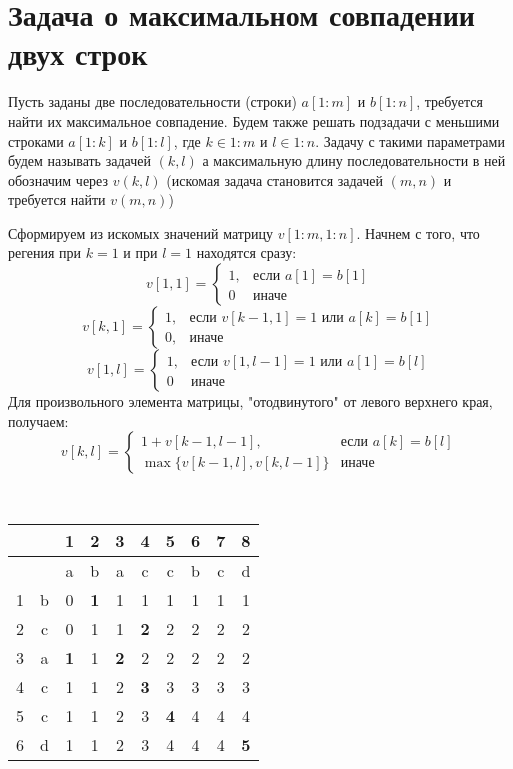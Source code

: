 \documentclass[discrete.tex]{subfiles}
\begin{document}
  \section{Задача о максимальном совпадении двух строк}

  \begin{Task}
    Пусть заданы две последовательности (строки) $a[1:m]$ и $b[1:n]$, требуется найти их максимальное совпадение. Будем также решать подзадачи с меньшими строками $a[1:k]$ и $b[1:l]$, где $k \in 1:m$ и $l \in 1:n$. Задачу с такими параметрами будем называть задачей $(k,l)$ а максимальную длину последовательности в ней обозначим через $v(k,l)$ (искомая задача становится задачей $(m,n)$ и требуется найти $v(m,n)$)

    Сформируем из искомых значений матрицу $v[1:m,1:n]$. Начнем с того, что регения при $k=1$ и при $l=1$ находятся сразу:
    \[v[1,1] = \begin{cases}
      1, & \text{если }a[1]=b[1]\\
      0 & \text{иначе}
    \end{cases}\]
    \[v[k,1] = \begin{cases}
      1, & \text{если }v[k-1,1]=1 \text{ или } a[k]=b[1]\\
      0, & \text{иначе}
    \end{cases}\]
    \[v[1,l] = \begin{cases}
      1, & \text{если }v[1,l-1]=1 \text{ или } a[1]=b[l]\\
      0 & \text{иначе}
    \end{cases}\]
    Для произвольного элемента матрицы, "отодвинутого"{} от левого верхнего края, получаем:
    \[v[k,l] = \begin{cases}
      1 + v[k-1,l-1], & \text{если }a[k]=b[l]\\
      \max\{v[k-1,l],v[k,l-1]\} & \text{иначе}
    \end{cases}\]
  \end{Task}

  \begin{example} \ \\
    \begin{tabular}{c|c|cccccccc}
        &   & 1 & 2 & 3 & 4 & 5 & 6 & 7 & 8\\
        \hline
        &   & a & b & a & c & c & b & c & d\\
      \hline
      1 & b & 0 & \bfseries 1 & 1 & 1 & 1 & 1 & 1 & 1\\
      2 & c & 0 & 1 & 1 & \bfseries 2 & 2 & 2 & 2 & 2\\
      3 & a & \bfseries 1 & 1 & \bfseries 2 & 2 & 2 & 2 & 2 & 2\\
      4 & c & 1 & 1 & 2 & \bfseries 3 & 3 & 3 & 3 & 3\\
      5 & c & 1 & 1 & 2 & 3 & \bfseries 4 & 4 & 4 & 4\\
      6 & d & 1 & 1 & 2 & 3 & 4 & 4 & 4 & \bfseries 5
    \end{tabular}
  \end{example}
\end{document}
